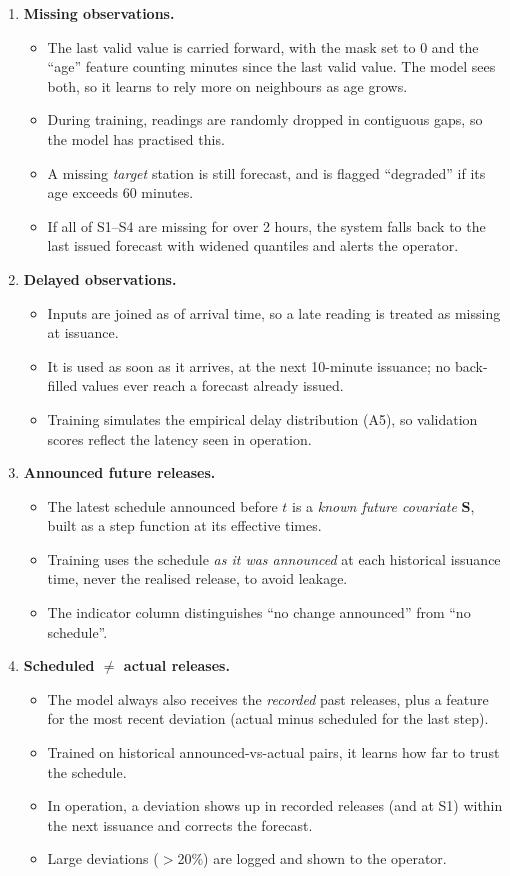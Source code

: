 \documentclass[11pt]{article}
\begin{document}
\begin{enumerate}[label=(\roman*)]
\item \textbf{Missing observations.}
\begin{itemize}
  \item The last valid value is carried forward, with the mask set to 0 and the ``age'' feature counting minutes since the last valid value. The model sees both, so it learns to rely more on neighbours as age grows.
  \item During training, readings are randomly dropped in contiguous gaps, so the model has practised this.
  \item A missing \emph{target} station is still forecast, and is flagged ``degraded'' if its age exceeds 60 minutes.
  \item If all of S1--S4 are missing for over 2 hours, the system falls back to the last issued forecast with widened quantiles and alerts the operator.
\end{itemize}
\item \textbf{Delayed observations.}
\begin{itemize}
  \item Inputs are joined as of arrival time, so a late reading is treated as missing at issuance.
  \item It is used as soon as it arrives, at the next 10-minute issuance; no back-filled values ever reach a forecast already issued.
  \item Training simulates the empirical delay distribution (A5), so validation scores reflect the latency seen in operation.
\end{itemize}
\item \textbf{Announced future releases.}
\begin{itemize}
  \item The latest schedule announced before $t$ is a \emph{known future covariate} $\mathbf{S}$, built as a step function at its effective times.
  \item Training uses the schedule \emph{as it was announced} at each historical issuance time, never the realised release, to avoid leakage.
  \item The indicator column distinguishes ``no change announced'' from ``no schedule''.
\end{itemize}
\item \textbf{Scheduled $\neq$ actual releases.}
\begin{itemize}
  \item The model always also receives the \emph{recorded} past releases, plus a feature for the most recent deviation (actual minus scheduled for the last step).
  \item Trained on historical announced-vs-actual pairs, it learns how far to trust the schedule.
  \item In operation, a deviation shows up in recorded releases (and at S1) within the next issuance and corrects the forecast.
  \item Large deviations ($>$20\%) are logged and shown to the operator.
\end{itemize}
\end{enumerate}
\end{document}
